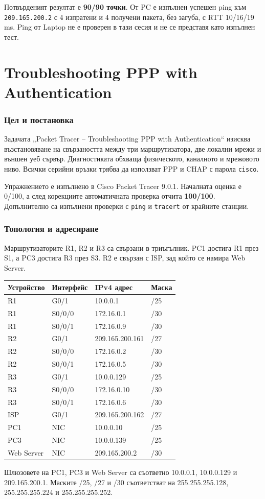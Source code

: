 \documentclass[12pt]{article}
\begin{document}
Потвърденият резултат е \textbf{90/90 точки}. От PC е изпълнен успешен ping към \texttt{209.165.200.2} с 4 изпратени и 4 получени пакета, без загуба, с RTT 10/16/19 ms. Ping от Laptop не е проверен в тази сесия и не се представя като изпълнен тест.


\clearpage
\part{Troubleshooting PPP with Authentication}
\section{Цел и постановка}
Задачата „Packet Tracer -- Troubleshooting PPP with Authentication“ изисква възстановяване на свързаността между три маршрутизатора, две локални мрежи и външен уеб сървър. Диагностиката обхваща физическото, каналното и мрежовото ниво. Всички серийни връзки трябва да използват PPP и CHAP с парола \texttt{cisco}.

Упражнението е изпълнено в Cisco Packet Tracer 9.0.1. Началната оценка е 0/100, а след корекциите автоматичната проверка отчита \textbf{100/100}. Допълнително са изпълнени проверки с \texttt{ping} и \texttt{tracert} от крайните станции.

\section{Топология и адресиране}
Маршрутизаторите R1, R2 и R3 са свързани в триъгълник. PC1 достига R1 през S1, а PC3 достига R3 през S3. R2 е свързан с ISP, зад който се намира Web Server.

\begin{center}\small
\begin{longtable}{llll}
\toprule Устройство & Интерфейс & IPv4 адрес & Маска \\\midrule
R1 & G0/1 & 10.0.0.1 & /25 \\
R1 & S0/0/0 & 172.16.0.1 & /30 \\
R1 & S0/0/1 & 172.16.0.9 & /30 \\
R2 & G0/1 & 209.165.200.161 & /27 \\
R2 & S0/0/0 & 172.16.0.2 & /30 \\
R2 & S0/0/1 & 172.16.0.5 & /30 \\
R3 & G0/1 & 10.0.0.129 & /25 \\
R3 & S0/0/0 & 172.16.0.10 & /30 \\
R3 & S0/0/1 & 172.16.0.6 & /30 \\
ISP & G0/1 & 209.165.200.162 & /27 \\
PC1 & NIC & 10.0.0.10 & /25 \\
PC3 & NIC & 10.0.0.139 & /25 \\
Web Server & NIC & 209.165.200.2 & /30 \\\bottomrule
\end{longtable}\end{center}
Шлюзовете на PC1, PC3 и Web Server са съответно 10.0.0.1, 10.0.0.129 и 209.165.200.1. Маските /25, /27 и /30 съответстват на 255.255.255.128, 255.255.255.224 и 255.255.255.252.
\end{document}
